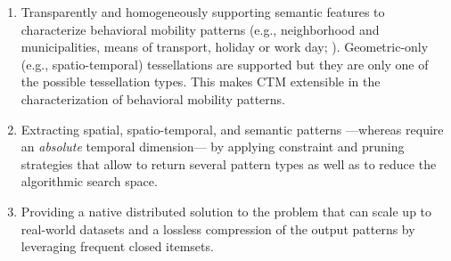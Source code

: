 \documentclass[
]{ceurart}
\begin{document}
\begin{enumerate}
    \item Transparently and homogeneously supporting semantic features to characterize behavioral mobility patterns (e.g., neighborhood and municipalities, means of transport, holiday or work day; ).
    Geometric-only (e.g., spatio-temporal) tessellations are supported but they are only one of the possible tessellation types.
    This makes CTM extensible in the characterization of behavioral mobility patterns. 
    \item Extracting spatial, spatio-temporal, and semantic patterns ---whereas \cite{DBLP:journals/ijitdm/PhanPT16,DBLP:journals/pvldb/FanZWT16} require an \textit{absolute} temporal dimension--- by applying constraint and pruning strategies that allow to return several pattern types as well as to reduce the algorithmic search space.
    \item Providing a native distributed solution to the problem that can scale up to real-world datasets and a lossless compression of the output patterns by leveraging frequent closed itemsets.
\end{enumerate}
\end{document}
